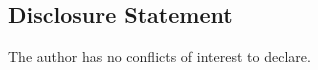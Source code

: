 \documentclass[]{hdsr}
\begin{document}
\subsection*{Disclosure Statement}
The author has no conflicts of interest to declare.


 










\printbibliography
\end{document}
